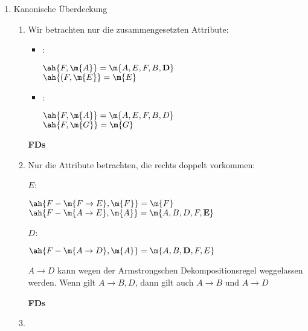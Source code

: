 \documentclass{lehramt-informatik-aufgabe}
\begin{document}
\begin{liAntwort}

\begin{enumerate}

\item Kanonische Überdeckung

\begin{enumerate}

%

\item {}

Wir betrachten nur die zusammengesetzten Attribute:

\begin{itemize}
\item {}:

$\ah{F, \m{A}} = \m{A, E, F, B, \textbf{D}}$ \\
$\ah{(F, \m{E}} = \m{E}$

\item {}:

$\ah{F, \m{A}} = \m{A, E, F, B, D}$ \\
$\ah{F, \m{G}} = \m{G}$
\end{itemize}

\textbf{FDs}


%

\item {}

Nur die Attribute betrachten, die rechts doppelt vorkommen:

$E$:

$\ah{F - \m{F \rightarrow E}, \m{F}} = \m{F}$ \\
$\ah{F - \m{A \rightarrow E}, \m{A}} = \m{A, B, D, F, \textbf{E}}$

$D$:

$\ah{F - \m{A \rightarrow D}, \m{A}} = \m{A, B, \textbf{D}, F, E}$

$A \rightarrow D$ kann wegen der Armstrongschen Dekompositionsregel
weggelassen werden. Wenn gilt $A \rightarrow B, D$, dann gilt auch $A
\rightarrow B$ und $A \rightarrow D$

\textbf{FDs}


\item {}



\end{enumerate}
\end{enumerate}
\end{liAntwort}
\end{document}
